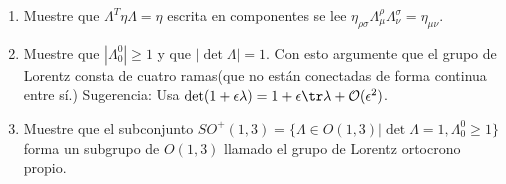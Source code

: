 \documentclass[../main]{subfiles}
\begin{document}
\begin{adjustwidth}{0pt}{-100pt}
\begin{enumerate}
\begin{enumerate}
        \item Muestre que $\Lambda^T \eta \Lambda=\eta$ escrita en componentes se lee $\eta_{\rho\sigma}\Lambda^{\rho}_{\mu}\Lambda^{\sigma}_{\nu}=\eta_{\mu\nu}$.
        \item Muestre que $|\Lambda^0_0|\geq 1$ y que $|\det \Lambda|=1$. Con esto argumente que el grupo de Lorentz consta de cuatro ramas(que no están conectadas de forma continua entre sí.) Sugerencia: Usa $\det (1+\epsilon\lambda)=1+\epsilon \tr \lambda+\mathcal{O}(\epsilon^2)$.
        \item Muestre que el subconjunto $SO^+(1, 3)=\{\Lambda \in O(1, 3)| \det \Lambda =1, \Lambda^0_0\geq 1\}$ forma un subgrupo de $O(1, 3)$ llamado el grupo de Lorentz ortocrono propio.
    \end{enumerate}
\end{enumerate}
\end{adjustwidth}
\end{document}
